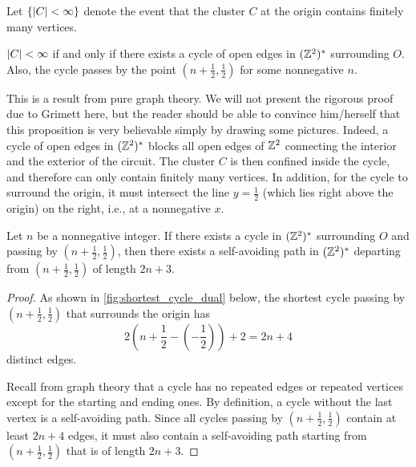 \documentclass[a4paper, 12pt]{article}
\begin{document}
Let $\{\lvert C \rvert < \infty\}$ denote the event that the cluster $C$ at the origin contains finitely many vertices.

\begin{prop}\label{prop:c_finite_iff_cycle}
$\lvert C \rvert < \infty$ if and only if there exists a cycle of open edges in $(\mathbb{Z}^2)^*$ surrounding $O$. Also, the cycle passes by the point $(n + \frac{1}{2}, \frac{1}{2})$ for some nonnegative $n$.
\end{prop}

This is a result from pure graph theory. We will not present the rigorous proof due to Grimett \autocite*[14--15]{grimmett_1999} here, but the reader should be able to convince him/herself that this proposition is very believable simply by drawing some pictures. Indeed, a cycle of open edges in $(\mathbb{Z}^2)^*$ blocks all open edges of $\mathbb{Z}^2$ connecting the interior and the exterior of the circuit. The cluster $C$ is then confined inside the cycle, and therefore can only contain finitely many vertices. In addition, for the cycle to surround the origin, it must intersect the line $y = \frac{1}{2}$ (which lies right above the origin) on the right, i.e., at a nonnegative $x$.

\begin{prop}\label{prop:cylce_implies_path}
Let $n$ be a nonnegative integer. If there exists a cycle in $(\mathbb{Z}^2)^*$ surrounding $O$ and passing by $(n + \frac{1}{2}, \frac{1}{2})$, then there exists a self-avoiding path in $(\mathbb{Z}^2)^*$ departing from $(n + \frac{1}{2}, \frac{1}{2})$ of length $2n + 3$.
\end{prop}
\begin{proof}
As shown in \cref{fig:shortest_cycle_dual} below, the shortest cycle passing by $(n + \frac{1}{2}, \frac{1}{2})$ that surrounds the origin has \[2\left(n + \frac{1}{2} - (-\frac{1}{2})\right) + 2 = 2n + 4\] distinct edges.


Recall from graph theory that a cycle has no repeated edges or repeated vertices except for the starting and ending ones. By definition, a cycle without the last vertex is a self-avoiding path. Since all cycles passing by $(n + \frac{1}{2}, \frac{1}{2})$ contain at least $2n + 4$ edges, it must also contain a self-avoiding path starting from $(n + \frac{1}{2}, \frac{1}{2})$ that is of length $2n + 3$.
\end{proof}
\end{document}
